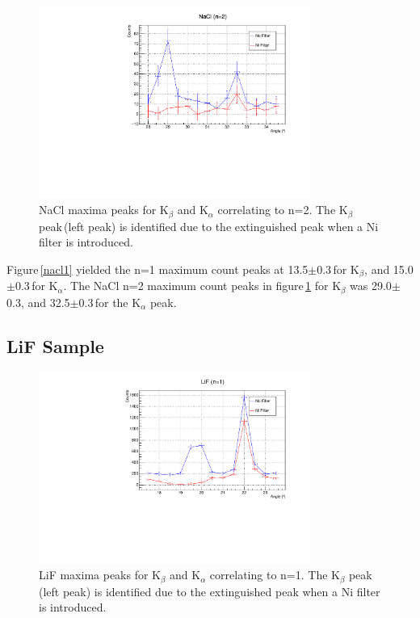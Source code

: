 \documentclass[aps,prl,twocolumn,superscriptaddress,nofootinbib]{revtex4-1}
\begin{document}
\begin{figure}[h!]
  \begin{center}
\centerline{\includegraphics[width=3.5in]{nacl2.pdf}}
\caption{ \small{NaCl maxima peaks for K$_\beta$ and K$_\alpha$ correlating to n=2. The K$_\beta$ peak\,(left peak) is identified due to the extinguished peak when a Ni filter is introduced. \label{nacl2}}}
  \end{center}
\end{figure}

Figure\,\ref{nacl1} yielded the n=1 maximum count peaks at 13.5\degree$\pm$0.3\degree\,for K$_\beta$, and 15.0\degree$\pm$0.3\degree\,for K$_\alpha$. The NaCl n=2 maximum count peaks in figure\,\ref{nacl2} for K$_\beta$ was 29.0\degree$\pm$0.3\degree, and 32.5\degree$\pm$0.3\degree\,for the K$_\alpha$ peak.

\vfill\eject


\subsection{LiF Sample}

\begin{figure}[h!]
  \begin{center}
\centerline{\includegraphics[width=3.5in]{lif1.pdf}}
\caption{ \small{LiF maxima peaks for K$_\beta$ and K$_\alpha$ correlating to n=1. The K$_\beta$ peak\,(left peak) is identified due to the extinguished peak when a Ni filter is introduced. \label{lif1}}}
  \end{center}
\end{figure}
\end{document}
